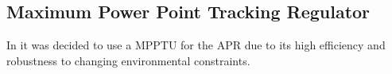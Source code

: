 %
%
%
%
\subsection{Maximum Power Point Tracking Regulator}
%
In \cite{PDR} it was decided to use a \ac{MPPTU} for the \ac{APR} due to its high efficiency and robustness to changing environmental constraints.

